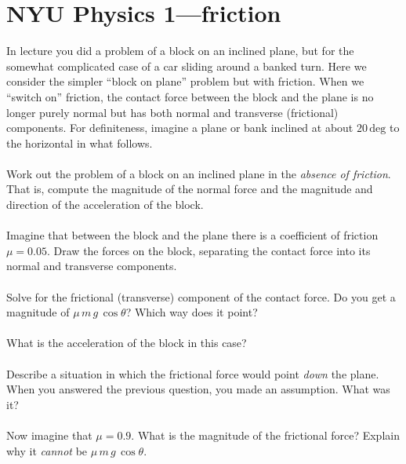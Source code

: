 \documentclass[12pt]{article}
\begin{document}
\renewcommand{\deg}{\mathrm{deg}}
\newcommand{\kg}{\mathrm{kg}}
\newcommand{\m}{\mathrm{m}}
\newcommand{\s}{\mathrm{s}}
\newcommand{\mps}{\m\,\s^{-1}}
\thispagestyle{empty}

\section*{NYU Physics 1---friction}

In lecture you did a problem of a block on an inclined plane, but for
the somewhat complicated case of a car sliding around a banked turn.
Here we consider the simpler ``block on plane'' problem but with
friction.  When we ``switch on'' friction, the contact force between
the block and the plane is no longer purely normal but has both normal
and transverse (frictional) components.  For definiteness, imagine a
plane or bank inclined at about $20\,\deg$ to the horizontal in what
follows.

\paragraph{\theproblem}%
Work out the problem of a block on an inclined plane in the
\emph{absence of friction}.  That is, compute the magnitude of the
normal force and the magnitude and direction of the acceleration of
the block.

\paragraph{\theproblem}%
Imagine that between the block and the plane there is a coefficient of
friction $\mu=0.05$.  Draw the forces on the block, separating the
contact force into its normal and transverse components.

\paragraph{\theproblem}%
Solve for the frictional (transverse) component of the contact force.
Do you get a magnitude of $\mu\,m\,g\,\cos\theta$?  Which way does it
point?

\paragraph{\theproblem}%
What is the acceleration of the block in this case?

\paragraph{\theproblem}%
Describe a situation in which the frictional force would point
\emph{down} the plane.  When you answered the previous question, you
made an assumption.  What was it?

\paragraph{\theproblem}%
Now imagine that $\mu=0.9$.  What is the magnitude of the frictional
force?  Explain why it \emph{cannot} be $\mu\,m\,g\,\cos\theta$.
\end{document}
